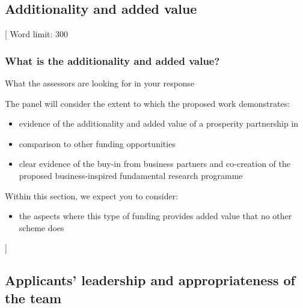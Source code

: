 \documentclass{article}
\newcommand{\desc}[1]{{\leavevmode\color{blue}[#1]}}
\begin{document}
% 

\subsection{Additionality and added value}

\desc{
Word limit: 300

\subsubsection*{What is the additionality and added value?}

What the assessors are looking for in your response

The panel will consider the extent to which the proposed work demonstrates:

\begin{itemize}

    \item evidence of the additionality and added value of a prosperity
        partnership in

    \item comparison to other funding opportunities

    \item clear evidence of the buy-in from business partners and co-creation
        of the proposed business-inspired fundamental research programme

\end{itemize}

Within this section, we expect you to consider:

\begin{itemize}

    \item the aspects where this type of funding provides added value that no
        other scheme does

\end{itemize}

}

% 

\subsection{Applicants’ leadership and appropriateness of the team}
\end{document}

